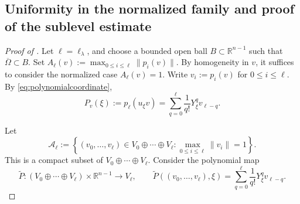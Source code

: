\documentclass[reqno,11pt]{amsart}
\numberwithin{equation}{section}
\theoremstyle{definition}
\theoremstyle{remark}
\begin{document}
\subsection{Uniformity in the normalized family and proof of the sublevel estimate}
\label{s:proof-sublevel-theorem}
\begin{proof}[Proof of ]
Let $\ell=\ell_\lambda$, and choose a bounded open ball
$B\subset\mathbb R^{n-1}$ such that $\overline\Omega\subset B$. Set
$
A_\ell(v):=\max_{0\le i\le\ell}\|p_i(v)\|.
$
By homogeneity in $v$, it suffices to consider the normalized case $A_\ell(v)=1$.
Write $v_i:=p_i(v)$ for $0\le i\le\ell$. By
\eqref{eq:polynomialcoordinate},
\begin{equation}\label{eq:Pv-expansion-sublevel}
P_v(\xi):=p_\ell(u_\xi v)
=
\sum_{q=0}^{\ell}\frac{1}{q!}Y_\xi^qv_{\ell-q}.
\end{equation}

Let
$$
\mathcal A_\ell
:=
\left\{
(v_0,\ldots,v_\ell)\in V_0\oplus\cdots\oplus V_\ell:
\max_{0\le i\le\ell}\|v_i\|=1
\right\}.
$$
This is a compact subset of $V_0\oplus\cdots\oplus V_\ell$. Consider
the polynomial map
$$
\widetilde P:
(V_0\oplus\cdots\oplus V_\ell)\times\mathbb R^{n-1}
\to V_\ell,
\qquad
\widetilde P((v_0,\ldots,v_\ell),\xi)
=
\sum_{q=0}^{\ell}\frac{1}{q!}Y_\xi^qv_{\ell-q}.
$$


\end{proof}
\end{document}
